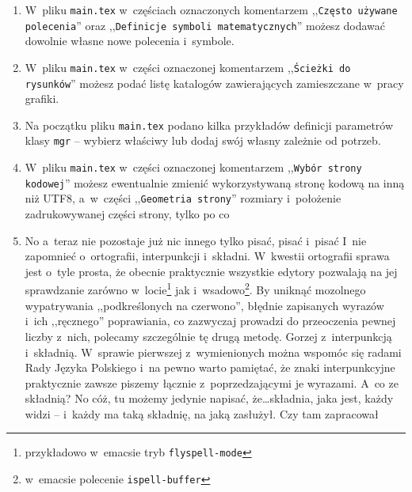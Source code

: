 \begin{enumerate}
\item W~pliku \texttt{main.tex} w~częściach oznaczonych komentarzem ,,\texttt{Często używane polecenia}'' oraz ,,\texttt{Definicje symboli matematycznych}'' możesz dodawać dowolnie własne nowe polecenia i~symbole.

\item W~pliku \texttt{main.tex} w~części oznaczonej komentarzem ,,\texttt{Ścieżki do rysunków}'' możesz podać listę katalogów zawierających zamieszczane w~pracy grafiki. 
  
\item Na początku pliku \texttt{main.tex} podano kilka przykładów definicji parametrów klasy \texttt{mgr} -- wybierz właściwy lub dodaj swój własny zależnie od potrzeb.

\item W~pliku \texttt{main.tex} w~części oznaczonej komentarzem ,,\texttt{Wybór strony kodowej}'' możesz ewentualnie zmienić wykorzystywaną stronę kodową na inną niż UTF8, a~w~części ,,\texttt{Geometria strony}'' rozmiary i~położenie zadrukowywanej części strony,  tylko po co \smiley
  
\item No a~teraz nie pozostaje już nic innego tylko pisać, pisać i~pisać \smiley{} I~nie zapomnieć o~ortografii, interpunkcji i~składni. W~kwestii ortografii sprawa jest o~tyle prosta, że obecnie praktycznie wszystkie edytory pozwalają na jej sprawdzanie zarówno w~locie\footnote{przykładowo w~emacsie tryb \texttt{flyspell-mode}} jak i~wsadowo\footnote{w~emacsie polecenie \texttt{ispell-buffer}}. By uniknąć mozolnego wypatrywania ,,podkreślonych na czerwono'', błędnie zapisanych wyrazów i~ich ,,ręcznego'' poprawiania, co zazwyczaj prowadzi do przeoczenia pewnej liczby z~nich, polecamy szczególnie tę drugą metodę. Gorzej z~interpunkcją i~składnią. W~sprawie pierwszej z~wymienionych można wspomóc się radami Rady Języka Polskiego \cite{interpunkcja} i~na pewno warto pamiętać, że znaki interpunkcyjne praktycznie zawsze piszemy łącznie z~poprzedzającymi je wyrazami. A~co ze składnią? No cóż, tu możemy jedynie napisać, że\ldots składnia, jaka jest, każdy widzi -- i~każdy ma taką składnię, na jaką zasłużył. Czy tam zapracował \smiley


\end{enumerate}
